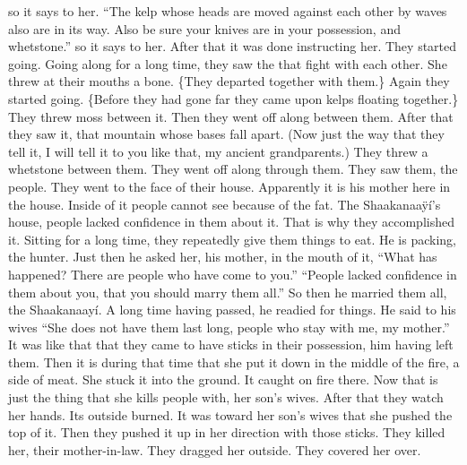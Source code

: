 \begin{pairs}
\begin{Rightside}
so it says to her.
\qqk{}“The kelp whose heads are moved against each other by waves also are in its way.
Also be sure your knives are in your possession, and whetstone.”
so it says to her.
After that it was done instructing her.
They started going.
Going along for a long time, they saw the  that fight with each other.
She threw at their mouths a bone.
\{They departed together with them.\}
Again they started going.
\{Before they had gone far they came upon kelps floating together.\}
They threw moss between it.
Then they went off along between them.
After that they saw it, that mountain whose bases fall apart.
(Now just the way that they tell it, I will tell it to you like that, my ancient grandparents.)
They threw a whetstone between them.
They went off along through them.
They saw them, the people.
They went to the face of their house.
\pend
\pstart
{}Apparently it is his mother here in the house.
Inside of it people cannot see because of the fat.
The Shaakanaaÿí’s house, people lacked confidence in them about it.
That is why they accomplished it.
Sitting for a long time, they repeatedly give them things to eat.
He is packing, the hunter.
Just then he asked her, his mother, in the mouth of it,
\qqk{}“What has happened?
There are people who have come to you.”
\qqk{}“People lacked confidence in them about you, that you should marry them all.”
So then he married them all, the Shaakanaayí.
\pend
\pstart
{}A long time having passed, he readied for things.
He said to his wives
\qqk{}“She does not have them last long, people who stay with me, my mother.”
It was like that that they came to have sticks in their possession, him having left them.
Then it is during that time that she put it down in the middle of the fire, a side of meat.
She stuck it into the ground.
It caught on fire there.
Now that is just the thing that she kills people with, her son’s wives.
After that they watch her hands.
Its outside burned.
It was toward her son’s wives that she pushed the top of it.
Then they pushed it up in her direction with those sticks.
They killed her, their mother-in-law.
They dragged her outside.
They covered her over.

\end{Rightside}
\end{pairs}
